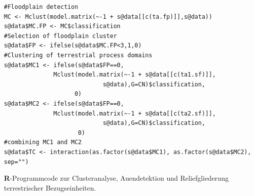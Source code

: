 \begin{program}[t]
\begin{verbatim}
#Floodplain detection 
MC <- Mclust(model.matrix(~-1 + s@data[[c(ta.fp)]],s@data))
s@data$MC.FP <- MC$classification
#Selection of floodplain cluster
s@data$FP <- ifelse(s@data$MC.FP<3,1,0)
#Clustering of terrestrial process domains
s@data$MC1 <- ifelse(s@data$FP==0,
              Mclust(model.matrix(~-1 + s@data[[c(ta1.sf)]],
							s@data),G=CN)$classification,
                    0)
s@data$MC2 <- ifelse(s@data$FP==0,
              Mclust(model.matrix(~-1 + s@data[[c(ta2.sf)]],
							s@data),G=CN)$classification,
                     0)
#combining MC1 and MC2
s@data$TC <- interaction(as.factor(s@data$MC1), as.factor(s@data$MC2), sep="")
\end{verbatim}
\caption{\textbf{R}-Programmcode zur Clusteranalyse, Auendetektion und Reliefgliederung terrestrischer Bezugseinheiten.} 
\label{prog:tc} 
\end{program} 

